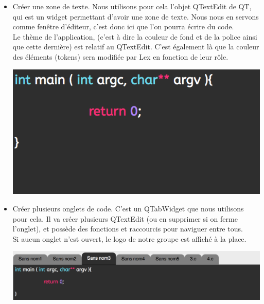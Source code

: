 \documentclass[a4paper,12pt]{article}
\begin{document}
		\begin{itemize}
		
			\item Créer une zone de texte. Nous utilisons pour cela l'objet QTextEdit de QT, qui est un widget permettant d'avoir une zone de texte. Nous nous en servons comme fenêtre d'éditeur, c'est donc ici que l'on pourra écrire du code.\\
			Le thème de l'application, (c'est à dire la couleur de fond et de la police ainsi que cette dernière) est relatif au QTextEdit. C'est également là que la couleur des éléments (tokens) sera modifiée par Lex en fonction de leur rôle.\\
			\begin{center}
				\includegraphics[scale=1]{images/QTextEdit}
				\vspace{0.5cm}
			\end{center}
			
			\item Créer plusieurs onglets de code. C'est un QTabWidget que nous utilisons pour cela. Il va créer plusieurs QTextEdit (ou en supprimer si on ferme l'onglet), et possède des fonctions et raccourcis pour naviguer entre tous. \\
			Si aucun onglet n'est ouvert, le logo de notre groupe est affiché à la place.\\
			\begin{center}
				\includegraphics[scale=0.6]{images/QTabWidget}
				\vspace{0.5cm}
			\end{center}
			

\end{itemize}
\end{document}
